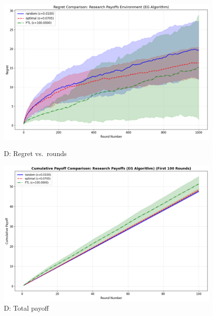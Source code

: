\documentclass[10pt]{article}
\begin{document}
\begin{figure}[h!]
\centering
\begin{minipage}[t]{0.48\textwidth}
    \centering
    \includegraphics[width=\linewidth]{332Project2/figures/RP_regret.png}
    \caption*{\footnotesize D: Regret vs.\ rounds}
\end{minipage}\hfill
\begin{minipage}[t]{0.48\textwidth}
    \centering
    \includegraphics[width=\linewidth]{332Project2/figures/RP_payoff.png}
    \caption*{\footnotesize D: Total payoff}
\end{minipage}
\end{figure}
\end{document}
